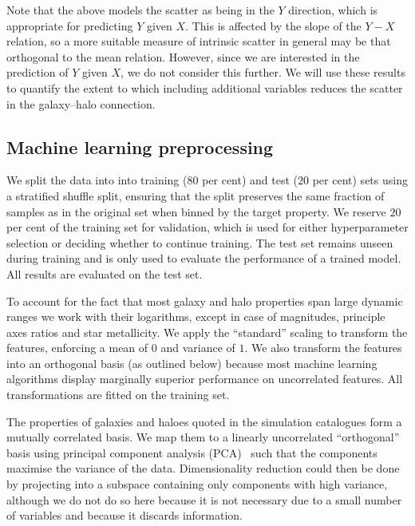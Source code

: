 \documentclass[usenatbib,useAMS]{mnras}
\begin{document}
Note that the above models the scatter as being in the $Y$ direction, which is appropriate for predicting $Y$ given $X$. This is affected by the slope of the $Y-X$ relation, so a more suitable measure of intrinsic scatter in general may be that orthogonal to the mean relation. However, since we are interested in the prediction of $Y$ given $X$, we do not consider this further. We will use these results to quantify the extent to which including additional variables reduces the scatter in the galaxy--halo connection.


\subsection{Machine learning preprocessing}\label{sec:preprocess}

We split the data into into training ($80$ per cent) and test ($20$ per cent) sets using a stratified shuffle split, ensuring that the split preserves the same fraction of samples as in the original set when binned by the target property. We reserve $20$ per cent of the training set for validation, which is used for either hyperparameter selection or deciding whether to continue training.
The test set remains unseen during training and is only used to evaluate the performance of a trained model. All results are evaluated on the test set.

To account for the fact that most galaxy and halo properties span large dynamic ranges we work with their logarithms, except in case of magnitudes, principle axes ratios and star metallicity. We apply the ``standard'' scaling to transform the features, enforcing a mean of $0$ and variance of $1$. We also transform the features into an orthogonal basis (as outlined below) because most machine learning algorithms display marginally superior performance on uncorrelated features. All transformations are fitted on the training set.

The properties of galaxies and haloes quoted in the simulation catalogues form a mutually correlated basis. We map them to a linearly uncorrelated ``orthogonal'' basis using principal component analysis (PCA)~\citep{pearson_PCA,hotelling_PCA} such that the components maximise the variance of the data. Dimensionality reduction could then be done by projecting into a subspace containing only components with high variance, although we do not do so here because it is not necessary due to a small number of variables and because it discards information.
\end{document}
